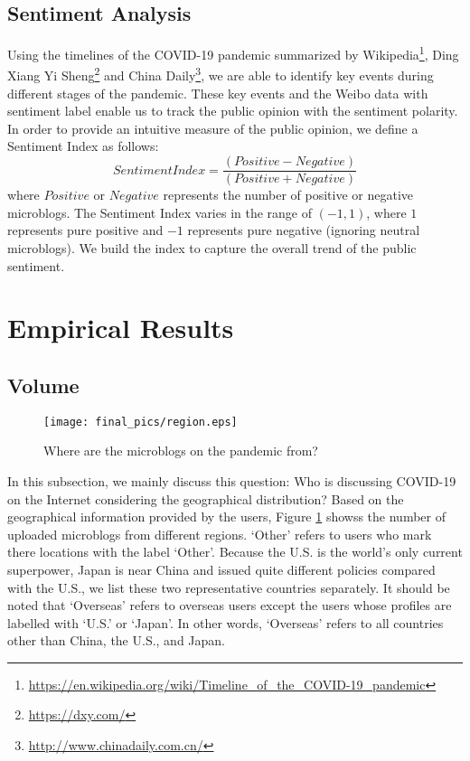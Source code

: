 \documentclass[sigconf, nonacm=true]{acmart}
\begin{document}
\subsection{Sentiment Analysis}
Using the timelines of the COVID-19 pandemic summarized by
Wikipedia\footnote{\url{https://en.wikipedia.org/wiki/Timeline_of_the_COVID-19_pandemic}},
Ding Xiang Yi Sheng\footnote{\url{https://dxy.com/}} and China Daily\footnote{\url{http://www.chinadaily.com.cn/}},
we are able to identify key events during different stages of the pandemic.
These key events and the Weibo data with sentiment label enable us to track the public opinion with the sentiment polarity.
In order to provide an intuitive measure of the public opinion, we define a Sentiment Index as follows:
\begin{equation}
Sentiment Index = \frac{(Positive - Negative)}{(Positive + Negative)}
\label{eqn:sentiment index}
\end{equation}
where $Positive$ or $Negative$ represents the number of positive or negative microblogs.
The Sentiment Index varies in the range of $(-1, 1)$, where $1$ represents pure positive and $-1$ represents pure negative (ignoring neutral microblogs).
We build the index to capture the overall trend of the public sentiment.
\section{Empirical Results}
\subsection{Volume}
\begin{figure}[t]
  \texttt{[image: final\_pics/region.eps]}
  \vspace{-0.3cm}
  \caption{Where are the microblogs on the pandemic from?}
  \label{figure:region}
  \vspace{-0.3cm}
\end{figure}

In this subsection, we mainly discuss this question:
Who is discussing COVID-19 on the Internet considering the geographical distribution?
Based on the geographical information provided by the users, Figure \ref{figure:region} showss the number of uploaded microblogs from different regions.
`Other' refers to users who mark there locations with the label `Other'.
Because the U.S. is the world's only current superpower, Japan is near China and issued quite different policies compared with the U.S., we list these two representative countries separately.
It should be noted that `Overseas' refers to overseas users except the users whose profiles are labelled with `U.S.' or `Japan'. In other words, `Overseas' refers to all countries other than China, the U.S., and Japan. 
\end{document}
